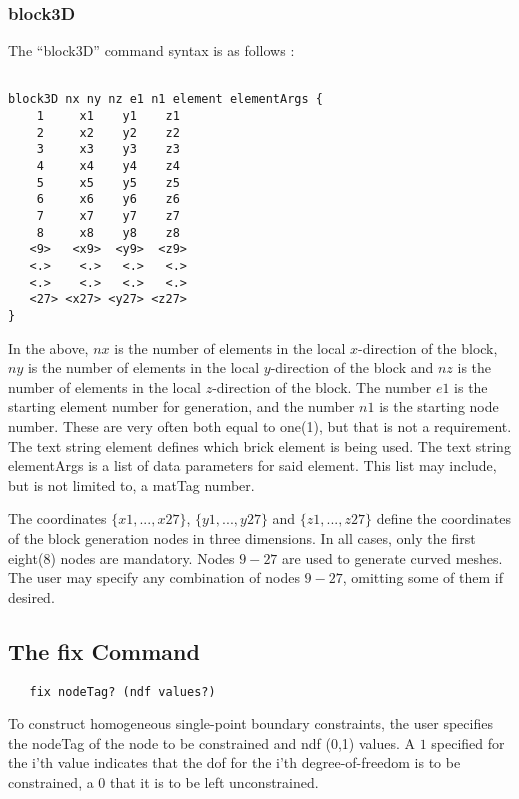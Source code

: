 \documentclass[12pt]{article}
\begin{document}
\subsubsection{block3D}
The ``block3D'' command syntax is as follows :
{\sf\small
\begin{verbatim}

block3D nx ny nz e1 n1 element elementArgs {
    1     x1    y1    z1 
    2     x2    y2    z2 
    3     x3    y3    z3 
    4     x4    y4    z4 
    5     x5    y5    z5 
    6     x6    y6    z6 
    7     x7    y7    z7 
    8     x8    y8    z8 
   <9>   <x9>  <y9>  <z9>   
   <.>    <.>   <.>   <.>
   <.>    <.>   <.>   <.>
   <27> <x27> <y27> <z27>
}
\end{verbatim}

}
In the above, $nx$ is the number of elements in the local $x$-direction of
the block,
$ny$ is the number of elements in the local $y$-direction of
the block and
$nz$ is the number of elements in the local $z$-direction of
the block.
The number $e1$ is the starting element number for generation, and 
the number $n1$ is the starting node number.  These are very often both equal to 
one(1), but that is not a requirement.  The text string \p element defines 
which brick element is being used.  The text string \p elementArgs
is a list of data parameters for said element.  This list may include, but is
not limited to, a matTag number.

The coordinates $\{x1,...,x27\}$, $\{y1,...,y27\}$ and $\{z1,...,z27\}$
define the coordinates
of the block generation nodes in three dimensions.  
In all cases, only the first eight(8) 
nodes are mandatory. Nodes $9-27$ are used to generate curved meshes.
The user may specify any combination of nodes $9-27$, omitting some of them
if desired.




\subsection{The fix Command}
{\sf\small
\begin{verbatim}
   fix nodeTag? (ndf values?)
\end{verbatim}
}

To construct homogeneous single-point boundary constraints, the user
specifies the nodeTag of the node to be constrained and ndf (0,1)
values. A $1$ specified for the i'th value indicates that the dof for
the i'th degree-of-freedom is to be constrained, a $0$ that it is to be
left unconstrained.
\end{document}
